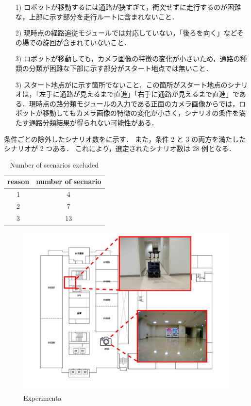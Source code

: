\begin{enumerate}
  \item [1)] ロボットが移動するには通路が狭すぎて，衝突せずに走行するのが困難な，上部に示す部分を走行ルートに含まれないこと．
  \item [2)] 現時点の経路追従モジュールでは対応していない，「後ろを向く」などその場での旋回が含まれていないこと．
  \item [3)] ロボットが移動しても，カメラ画像の特徴の変化が小さいため，通路の種類の分類が困難な下部に示す部分がスタート地点では無いこと．
  \item [3)] スタート地点がに示す箇所でないこと．この箇所がスタート地点のシナリオは，「左手に通路が見えるまで直進」「右手に通路が見えるまで直進」である．現時点の路分類モジュールの入力である正面のカメラ画像からでは，ロボットが移動してもカメラ画像の特徴の変化が小さく，シナリオの条件を満たす通路分類結果が得られない可能性がある．
\end{enumerate}

条件ごとの除外したシナリオ数をに示す．
また，条件 2 と 3 の両方を満たしたシナリオが 2 つある． 
これにより，選定されたシナリオ数は 28 例となる．
\begin{table}[htbp]
  \centering
  \caption{Number of scenarios excluded}\label{tab:remove}
  \begin{tabular}{c|c}
  \hline
  reason & number of secnario\\
  \hline
  1  & 4\\
  2  & 7\\
  3  & 13\\
  \hline
  \end{tabular}
\end{table}

\begin{figure}
  \centering
  \includegraphics[width=130mm]{images/pdf/ishiguro/keepout.pdf}
  \caption{Experimenta}
  \label{fig:keepout}
\end{figure}

